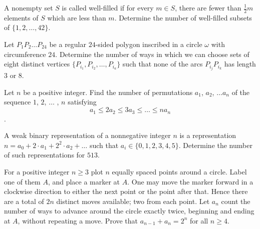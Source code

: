 \documentclass[mast]{lucky}
\begin{document}
\begin{prob}[HMMT 2016 T6]{9}
A nonempty set $S$ is called well-filled if for every $m \in S$, there are fewer than $\frac{1}{2} m$ elements of $S$ which are less than $m$. Determine the number of well-filled subsets of $\{1,2, \ldots, 42\}$.
\end{prob}

\begin{prob}{9}
Let $P_1P_2\ldots P_{24}$ be
a regular $24$-sided polygon inscribed in a circle $\omega$ with circumference 
$24.$ Determine the number of ways in which we can choose sets of
eight distinct vertices $\{P_{i_1} , P_{i_2}
,\ldots , P_{i_a }\}$ such that none of the arcs
$P_{i_j}P_{i_k}$ has length $3$ or $8.$ 
\end{prob}

\begin{prob}[ISL 2020 C1]{9}
Let $n$ be a positive integer. Find the number of permutations $a_1$, $a_2$, $\dots a_n$ of the
sequence $1$, $2$, $\dots$ , $n$ satisfying
$$a_1 \le 2a_2\le 3a_3 \le \dots \le na_n$$.
\end{prob}

\begin{prob}[PUMaC 2019 A/6]{13}

A weak binary representation of a nonnegative integer $n$ is a representation $n=a_0+2\cdot a_1+2^2\cdot a_2+\dots$ such that $a_i\in\{0,1,2,3,4,5\}$. Determine the number of such representations for $513$.
\end{prob}


\begin{prob}[USAMO 2013/2]{13}
For a positive integer $n\geq 3$ plot $n$ equally spaced points around a circle.  Label one of them $A$, and place a marker at $A$.  One may move the marker forward in a clockwise direction to either the next point or the point after that.  Hence there are a total of $2n$ distinct moves available; two from each point.  Let $a_n$ count the number of ways to advance around the circle exactly twice, beginning and ending at $A$, without repeating a move.  Prove that $a_{n-1}+a_n=2^n$ for all $n\geq 4$.
\end{prob}

%
%        
%        
\end{document}
